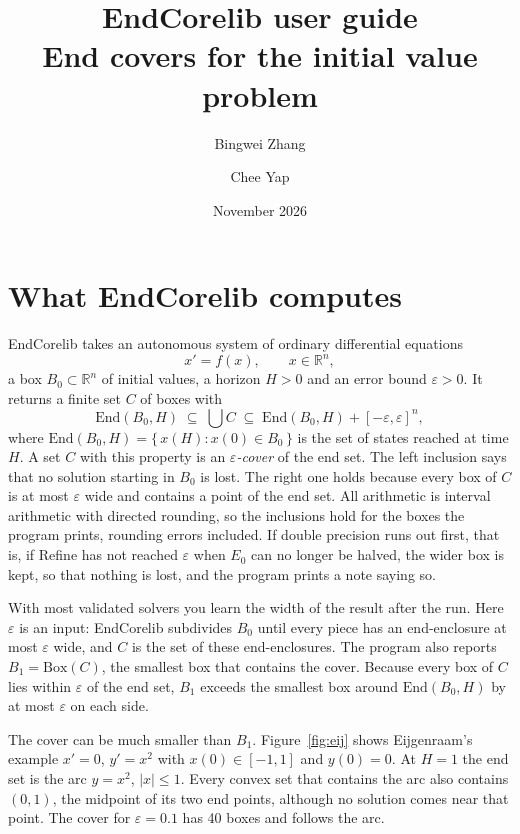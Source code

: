 \documentclass[11pt,a4paper]{article}
\title{EndCorelib user guide\\[4pt]
       \large End covers for the initial value problem}
\author{Bingwei Zhang \and Chee Yap}
\date{November 2026}
\newcommand{\eps}{\varepsilon}
\newcommand{\End}{\mathrm{End}}
\newcommand{\BoxOp}{\mathrm{Box}}
\begin{document}
\maketitle

\tableofcontents

\section{What EndCorelib computes}

EndCorelib takes an autonomous system of ordinary differential equations
\[
  x' = f(x), \qquad x \in \mathbb{R}^n,
\]
a box $B_0 \subset \mathbb{R}^n$ of initial values, a horizon $H > 0$ and an
error bound $\eps > 0$. It returns a finite set $C$ of boxes with
\begin{equation}\label{eq:cover}
  \End(B_0,H) \;\subseteq\; \bigcup C \;\subseteq\; \End(B_0,H) + [-\eps,\eps]^n ,
\end{equation}
where $\End(B_0,H) = \{\, x(H) : x(0) \in B_0 \,\}$ is the set of states
reached at time $H$. A set $C$ with this property is an \emph{$\eps$-cover}
of the end set. The left inclusion says that no solution starting in $B_0$ is
lost. The right one holds because every box of $C$ is at most $\eps$ wide and
contains a point of the end set. All arithmetic is interval arithmetic with
directed rounding, so the inclusions hold for the boxes the program prints,
rounding errors included. If double precision runs out first, that is, if
Refine has not reached $\eps$ when $E_0$ can no longer be halved, the wider
box is kept, so that nothing is lost, and the program prints a note saying
so.

With most validated solvers you learn the width of the result after the run.
Here $\eps$ is an input: EndCorelib subdivides $B_0$ until every piece has an
end-enclosure at most $\eps$ wide, and $C$ is the set of these
end-enclosures. The program also reports $B_1 = \BoxOp(C)$, the smallest box
that contains the cover. Because every box of $C$ lies within $\eps$ of the
end set, $B_1$ exceeds the smallest box around $\End(B_0,H)$ by at most
$\eps$ on each side.

The cover can be much smaller than $B_1$. Figure~\ref{fig:eij} shows
Eijgenraam's example $x' = 0$, $y' = x^2$ with $x(0) \in [-1,1]$ and
$y(0) = 0$. At $H = 1$ the end set is the arc $y = x^2$, $|x| \le 1$. Every
convex set that contains the arc also contains $(0,1)$, the midpoint of its
two end points, although no solution comes near that point. The cover for
$\eps = 0.1$ has 40 boxes and follows the arc.
\end{document}
